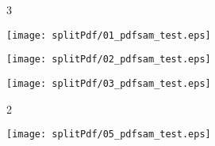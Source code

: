 \documentclass[portrait,a0c,final]{a0poster}
\newenvironment{poster}{
  \begin{center}
  \begin{minipage}[c]{0.98\textwidth}
}{
  \end{minipage} 
  \end{center}
}
\newenvironment{pcolumn}[1]{
  \begin{minipage}{#1\textwidth}
  \begin{center}
}{
  \end{center}
  \end{minipage}
}
\newcommand{\pbox}[4]{
\psshadowbox[#3]{
\begin{minipage}[t][#2][t]{#1}
#4
\end{minipage}
}}
\begin{document}
\begin{poster}
\begin{multicols}{3}
\begin{pcolumn}{0.3}
\texttt{[image: splitPdf/01\_pdfsam\_test.eps]}

\end{pcolumn}
\vspace{.5cm}
\begin{pcolumn}{0.3}

\texttt{[image: splitPdf/02\_pdfsam\_test.eps]}

\end{pcolumn}

\begin{pcolumn}{0.3}
\texttt{[image: splitPdf/03\_pdfsam\_test.eps]}


\end{pcolumn}
 \end{multicols}
\vspace{.5cm}
 \begin{multicols}{2}

\begin{pcolumn}{0.5}

 \texttt{[image: splitPdf/05\_pdfsam\_test.eps]}
  \end{pcolumn}
\vspace{.5cm}

\begin{pcolumn}{0.5}


\end{pcolumn}
\end{multicols}
\end{poster}
\end{document}
